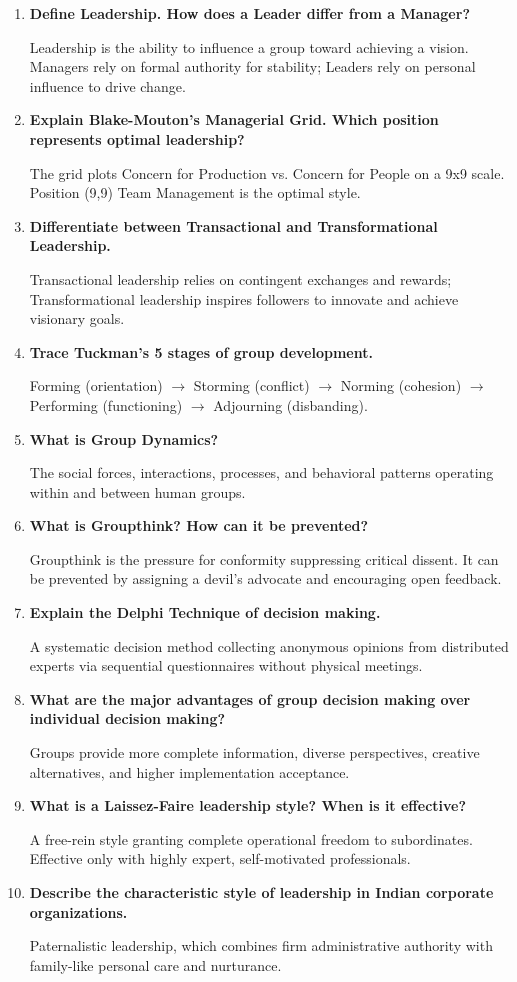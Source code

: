 \documentclass[11pt,a4paper]{article}
\newcommand{\Q}[1]{\textbf{#1}\par\noindent\ignorespaces}
\begin{document}
\begin{tcolorbox}[exambox, title={\textbf{Frequently Asked / Viva Questions}}]
\begin{enumerate}[leftmargin=*, itemsep=4pt]
  \item \Q{Define Leadership. How does a Leader differ from a Manager?}
    Leadership is the ability to influence a group toward achieving a vision. Managers rely on formal authority for stability; Leaders rely on personal influence to drive change.
  
  \item \Q{Explain Blake-Mouton's Managerial Grid. Which position represents optimal leadership?}
    The grid plots Concern for Production vs. Concern for People on a 9x9 scale. Position (9,9) Team Management is the optimal style.
  
  \item \Q{Differentiate between Transactional and Transformational Leadership.}
    Transactional leadership relies on contingent exchanges and rewards; Transformational leadership inspires followers to innovate and achieve visionary goals.
  
  \item \Q{Trace Tuckman's 5 stages of group development.}
    Forming (orientation) $\to$ Storming (conflict) $\to$ Norming (cohesion) $\to$ Performing (functioning) $\to$ Adjourning (disbanding).
  
  \item \Q{What is Group Dynamics?}
    The social forces, interactions, processes, and behavioral patterns operating within and between human groups.
  
  \item \Q{What is Groupthink? How can it be prevented?}
    Groupthink is the pressure for conformity suppressing critical dissent. It can be prevented by assigning a devil's advocate and encouraging open feedback.
  
  \item \Q{Explain the Delphi Technique of decision making.}
    A systematic decision method collecting anonymous opinions from distributed experts via sequential questionnaires without physical meetings.
  
  \item \Q{What are the major advantages of group decision making over individual decision making?}
    Groups provide more complete information, diverse perspectives, creative alternatives, and higher implementation acceptance.
  
  \item \Q{What is a Laissez-Faire leadership style? When is it effective?}
    A free-rein style granting complete operational freedom to subordinates. Effective only with highly expert, self-motivated professionals.
  
  \item \Q{Describe the characteristic style of leadership in Indian corporate organizations.}
    Paternalistic leadership, which combines firm administrative authority with family-like personal care and nurturance.
\end{enumerate}
\end{tcolorbox}
\end{document}
